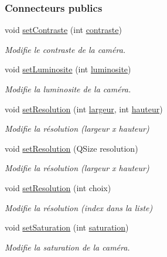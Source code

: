 \subsubsection*{Connecteurs publics}
\begin{DoxyCompactItemize}
\item 
void \hyperlink{class_camera_acc596f589be1e2e2d8e46e071ce38036}{set\+Contraste} (int \hyperlink{class_camera_ad3b300e52c91341d985d3b54f562a0f7}{contraste})
\begin{DoxyCompactList}\small\item\em Modifie le contraste de la caméra. \end{DoxyCompactList}\item 
void \hyperlink{class_camera_a25120dedc5f57638a866e1ff827fd641}{set\+Luminosite} (int \hyperlink{class_camera_aca5433bf19773161142d73009469b1ed}{luminosite})
\begin{DoxyCompactList}\small\item\em Modifie la luminosite de la caméra. \end{DoxyCompactList}\item 
void \hyperlink{class_camera_a966d13a5bf22c776f8d776d3da19182a}{set\+Resolution} (int \hyperlink{class_camera_ad64f26cdfc5aa561208b273d430938cf}{largeur}, int \hyperlink{class_camera_a5d89d7f9d1a5eab4175dd168c7fbf1c7}{hauteur})
\begin{DoxyCompactList}\small\item\em Modifie la résolution (largeur x hauteur) \end{DoxyCompactList}\item 
void \hyperlink{class_camera_a79630483bf9912a8fd1afe412ee8c848}{set\+Resolution} (Q\+Size resolution)
\begin{DoxyCompactList}\small\item\em Modifie la résolution (largeur x hauteur) \end{DoxyCompactList}\item 
void \hyperlink{class_camera_a7ff6343220c3ccd64ff513d2af37e1f3}{set\+Resolution} (int choix)
\begin{DoxyCompactList}\small\item\em Modifie la résolution (index dans la liste) \end{DoxyCompactList}\item 
void \hyperlink{class_camera_ace85018db120a6d61a5326172f97df93}{set\+Saturation} (int \hyperlink{class_camera_afd46d6d2451ee33b68dbc74713f2687c}{saturation})
\begin{DoxyCompactList}\small\item\em Modifie la saturation de la caméra. \end{DoxyCompactList}\end{DoxyCompactItemize}

